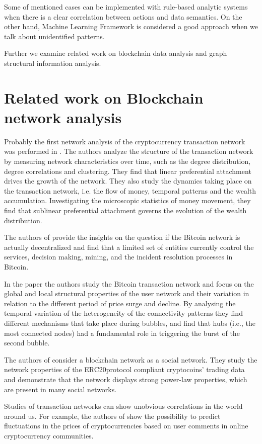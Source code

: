 Some of mentioned cases can be implemented with rule-based analytic systems when there is a clear correlation between actions and data semantics. On the other hand, Machine Learning Framework is considered a good approach when we talk about unidentified patterns.

Further we examine related work on blockchain data analysis and graph structural information analysis.

\section{Related work on Blockchain network analysis}
Probably the first network analysis of the cryptocurrency transaction network was performed in \cite{kondor2014rich}. The authors analyze the structure of the transaction network by measuring network characteristics over time, such as the degree distribution, degree correlations and clustering. They find that linear preferential attachment drives the growth of the network. They also study the dynamics taking place on the transaction network, i.e. the flow of money, temporal patterns and the wealth accumulation. Investigating the microscopic statistics of money movement, they find that sublinear preferential attachment governs the evolution of the wealth distribution.

The authors of \cite{Gervais2014} provide the insights on the question if the Bitcoin network is actually decentralized and find that a limited set of entities currently control the services, decision making, mining, and the incident resolution processes in Bitcoin. 

In the paper \cite{Bovet2018network} the authors study the Bitcoin transaction network and focus on the global and local structural properties of the user network and their variation in relation to the different period of price surge and decline. By analysing the temporal variation of the heterogeneity of the connectivity patterns they find different mechanisms that take place during bubbles, and find that hubs (i.e., the most connected nodes) had a fundamental role in triggering the burst of the second bubble. 

The authors of \cite{somin2018social} consider a blockchain network as a social network. They study the network properties of the ERC20protocol compliant cryptocoins’ trading data and  demonstrate that the network displays strong power-law properties, which are present in many social networks. 

Studies of transaction networks can show unobvious correlations in the world around us. For example, the authors of \cite{Kim2016} show the possibility to predict fluctuations in the prices of cryptocurrencies based on user comments in online cryptocurrency communities.


